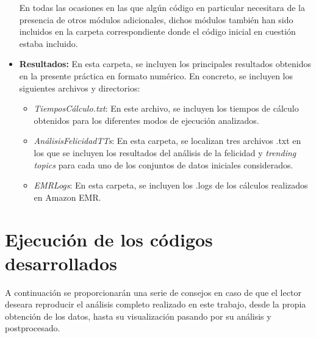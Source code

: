 \documentclass[10pt, spanish]{article}
\begin{document}
\begin{appendices}
\begin{itemize}
En todas las ocasiones en las que algún código en particular necesitara de la presencia de otros módulos adicionales, dichos módulos también han sido incluidos en la carpeta correspondiente donde el código inicial en cuestión estaba incluido.

\item \textbf{Resultados:} En esta carpeta, se incluyen los principales resultados obtenidos en la presente práctica en formato numérico. En concreto, se incluyen los siguientes archivos y directorios:
\begin{itemize}
\item \textit{TiemposCálculo.txt}: En este archivo, se incluyen los tiempos de cálculo obtenidos para los diferentes modos de ejecución analizados.
\item \textit{AnálisisFelicidadTTs}: En esta carpeta, se localizan tres archivos .txt en los que se incluyen los resultados del análisis de la felicidad y \textit{trending topics} para cada uno de los conjuntos de datos iniciales considerados.
\item \textit{EMRLogs}: En esta carpeta, se incluyen los .logs de los cálculos realizados en Amazon EMR.

\end{itemize}

\end{itemize}

\section{Ejecución de los códigos desarrollados}
\label{app:ejecucion_codigos}

A continuación se proporcionarán una serie de consejos en caso de que el lector deseara reproducir el análisis completo realizado en este trabajo, desde la propia obtención de los datos, hasta su visualización pasando por su análisis y postprocesado.


\end{appendices}
\end{document}

